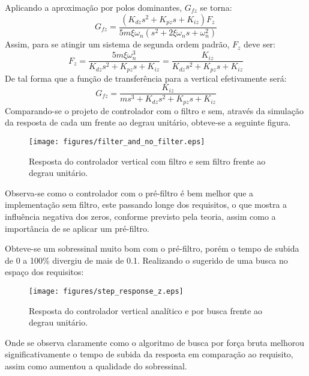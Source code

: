 \documentclass[a4paper]{article}
\begin{document}
	Aplicando a aproxima\c{c}\~ao por polos dominantes, $G_{fz}$ se torna:
	\begin{equation}
		G_{fz} = \frac{(K_{dz}s^2 + K_{pz}s + K_{iz})F_z}
		{5m\xi\omega_n(s^2 + 2\xi\omega_ns + \omega_n^2)}
    		\nonumber
	\end{equation}
	Assim, para se atingir um sistema de segunda ordem padr\~ao, $F_z$ deve ser:
	\begin{equation}
		F_z = \frac{5m\xi\omega_n^3}{K_{dz}s^2 + K_{pz}s + K_{iz}} =
		\frac{K_{iz}}{K_{dz}s^2 + K_{pz}s + K_{iz}}
		\nonumber
	\end{equation}
	De tal forma que a fun\c{c}\~ao de transfer\^encia para a vertical efetivamente ser\'a:
	\begin{equation}
		G_{fz} = \frac{K_{iz}}{ms^3 + K_{dz}s^2 + K_{pz}s + K_{iz}}
		\nonumber
	\end{equation}
	Comparando-se o projeto de controlador com o filtro e sem, atrav\'es da simula\c{c}\~ao
	da resposta de cada um frente ao degrau unit\'ario, obteve-se a seguinte figura.
	\begin{figure}[H]
		\centering
		\texttt{[image: figures/filter\_and\_no\_filter.eps]}
		\caption{Resposta do controlador vertical com filtro e sem filtro frente ao degrau
		unit\'ario.}
	\end{figure}
	Observa-se como o controlador com o pr\'e-filtro \'e bem melhor que a implementa\c{c}\~ao
	sem filtro, este passando longe dos requisitos, o que mostra a influ\^encia negativa dos zeros,
	conforme previsto pela teoria, assim como a import\^ancia de se aplicar um pr\'e-filtro.

	Obteve-se um sobressinal muito bom com o pr\'e-filtro, por\'em o tempo de subida de 0 a 100\%
	divergiu de mais de 0.1. Realizando o sugerido de uma busca no espa\c{c}o dos requisitos:
	\begin{figure}[H]
		\centering
		\texttt{[image: figures/step\_response\_z.eps]}
		\caption{Resposta do controlador vertical anal\'itico e por busca frente ao degrau
		unit\'ario.}
	\end{figure}
	Onde se observa claramente como o algoritmo de busca por for\c{c}a bruta melhorou
	significativamente o tempo de subida da resposta em compara\c{c}\~ao ao requisito,
	assim como aumentou a qualidade do sobressinal.
\end{document}
